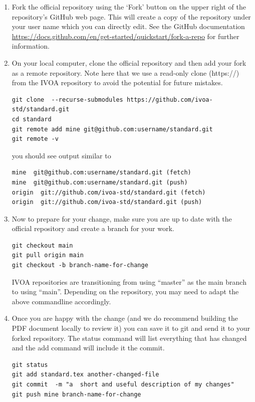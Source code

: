 \documentclass[11pt,a4paper]{ivoa}
\begin{document}
\begin{enumerate}

\item Fork the official repository using the `Fork' button on the upper
right of the repository's GitHub web page. This will create a copy of
the repository under your user name which you can directly edit. See the
GitHub documentation
\url{https://docs.github.com/en/get-started/quickstart/fork-a-repo} for
further information.

\item On your local computer, clone the official repository and
then add your fork as a remote repository. Note here that we use a
read-only clone (https://) from the IVOA repository to avoid the potential
for future mistakes.
\begin{lstlisting}[basicstyle=\footnotesize]
git clone  --recurse-submodules https://github.com/ivoa-std/standard.git
cd standard
git remote add mine git@github.com:username/standard.git
git remote -v
\end{lstlisting}

you should see output similar to
\begin{lstlisting}[basicstyle=\footnotesize]
mine  git@github.com:username/standard.git (fetch)
mine  git@github.com:username/standard.git (push)
origin  git://github.com/ivoa-std/standard.git (fetch)
origin  git://github.com/ivoa-std/standard.git (push)
\end{lstlisting}


\item Now to prepare for your change, make sure you are up to date with
the official repository and create a branch for your work.
\begin{lstlisting}
git checkout main
git pull origin main
git checkout -b branch-name-for-change
\end{lstlisting}

IVOA repositories are transitioning from using ``master'' as the main
branch to using ``main''.  Depending on the repository, you may need to
adapt the above commandline accordingly.

\item Once you are happy with the change (and we do recommend building
the PDF document locally to review it) you can save it to git and send
it to your forked repository.  The status command will list everything
that has changed and the add command will include it the commit.

\begin{lstlisting}
git status
git add standard.tex another-changed-file
git commit  -m "a  short and useful description of my changes"
git push mine branch-name-for-change
\end{lstlisting}


\end{enumerate}
\end{document}
